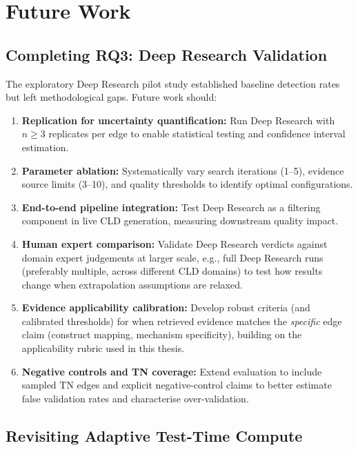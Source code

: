 \section{Future Work}
\label{sec:discussion_future}

\subsection{Completing RQ3: Deep Research Validation}

The exploratory Deep Research pilot study established baseline detection rates but left methodological gaps. Future work should:
\begin{enumerate}[noitemsep]
    \item \textbf{Replication for uncertainty quantification:} Run Deep Research with $n \geq 3$ replicates per edge to enable statistical testing and confidence interval estimation.
    \item \textbf{Parameter ablation:} Systematically vary search iterations (1--5), evidence source limits (3--10), and quality thresholds to identify optimal configurations.
    \item \textbf{End-to-end pipeline integration:} Test Deep Research as a filtering component in live CLD generation, measuring downstream quality impact.
    \item \textbf{Human expert comparison:} Validate Deep Research verdicts against domain expert judgements at larger scale, e.g., full Deep Research runs (preferably multiple, across different CLD domains) to test how results change when extrapolation assumptions are relaxed.
    \item \textbf{Evidence applicability calibration:} Develop robust criteria (and calibrated thresholds) for when retrieved evidence matches the \textit{specific} edge claim (construct mapping, mechanism specificity), building on the applicability rubric used in this thesis.
    \item \textbf{Negative controls and TN coverage:} Extend evaluation to include sampled TN edges and explicit negative-control claims to better estimate false validation rates and characterise over-validation.
\end{enumerate}

\subsection{Revisiting Adaptive Test-Time Compute}


